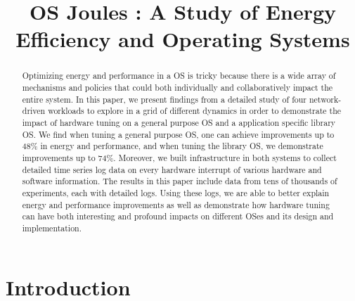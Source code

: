 \documentclass[letterpaper,twocolumn,10pt]{article}
\begin{document}
\date{}
\title{\Large \bf OS Joules : A Study of Energy Efficiency and Operating
Systems}


\maketitle

\begin{abstract}
  Optimizing energy and performance in a OS is tricky because there is a wide array of mechanisms and policies that could both individually and collaboratively impact the entire system. In this paper, we present findings from a detailed study of four network-driven workloads to explore in a grid of different dynamics in order to demonstrate the impact of hardware tuning on a general purpose OS and a application specific library OS. We find when tuning a general purpose OS, one can achieve improvements up to 48\% in energy and performance, and when tuning the library OS, we demonstrate improvements up to 74\%. Moreover, we built infrastructure in both systems to collect detailed time series log data on every hardware interrupt of various hardware and software information. The results in this paper include data from tens of thousands of experiments, each with detailed logs. Using these logs, we are able to better explain energy and performance improvements as well as demonstrate how hardware tuning can have both interesting and profound impacts on different OSes and its design and implementation.
  
\end{abstract}

\section{Introduction}

\end{document}
